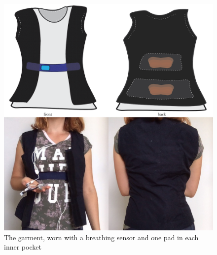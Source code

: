  \begin{figure}[t]
  \centering  
    \includegraphics[width=0.8\linewidth]{Chapters/Figures/soma_chi/fig_5_all_grid.png}
  \caption{The garment, worn with a breathing sensor and one pad in each inner pocket}
  \label{fig:garment}
\end{figure}


